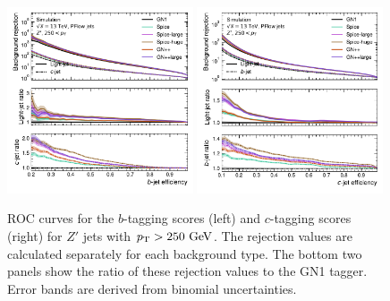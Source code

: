 \begin{figure}[ht]
    \centering
    \includegraphics[width=0.49\textwidth]{figures/flavour_tagging/b_roc_zprime_large.pdf}
    \includegraphics[width=0.49\textwidth]{figures/flavour_tagging/c_roc_zprime_large.pdf}
    \caption{ROC curves for the $b$-tagging scores (left) and $c$-tagging scores (right) for $Z'$ jets with $\pt > 250~\GeV$. The rejection values are calculated separately for each background type. The bottom two panels show the ratio of these rejection values to the GN1 tagger. Error bands are derived from binomial uncertainties.}
    \label{fig:zprime_roc}
\end{figure}

